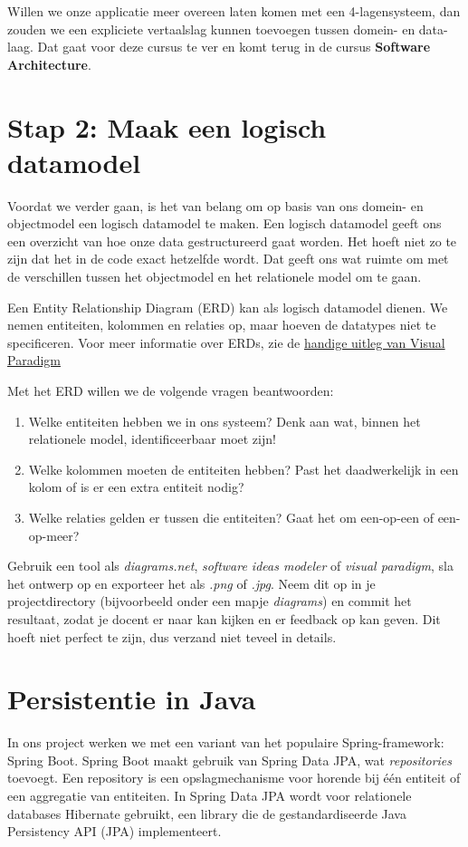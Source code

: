 \documentclass[dutch,a4paper,12pt,doubleside]{book}
\begin{document}
Willen we onze applicatie meer overeen laten komen met een 
4-lagensysteem, dan zouden we een expliciete 
vertaalslag kunnen toevoegen tussen domein- en data-laag. 
Dat gaat voor deze cursus te ver en komt terug in de cursus 
\textbf{Software Architecture}.

\section{Stap 2: Maak een logisch datamodel}
Voordat we verder gaan, is het van belang om op basis van 
ons domein- en objectmodel een logisch datamodel te maken. 
Een logisch datamodel geeft ons een overzicht van hoe onze 
data gestructureerd gaat worden. Het hoeft niet zo te zijn 
dat het in de code exact hetzelfde wordt. Dat geeft ons wat 
ruimte om met de verschillen tussen het objectmodel en het 
relationele model om te gaan.

Een Entity Relationship Diagram (ERD) kan als logisch datamodel dienen.
We nemen entiteiten, kolommen en relaties op, 
maar hoeven de datatypes niet te specificeren.
Voor meer informatie over ERDs, zie de 
\href{https://www.visual-paradigm.com/guide/data-modeling/what-is-entity-relationship-diagram/#erd-data-models-conceptual}{handige uitleg van Visual Paradigm}

Met het ERD willen we de volgende vragen beantwoorden:
\begin{enumerate}
    \item Welke entiteiten hebben we in ons systeem? 
    Denk aan wat, binnen het relationele model, identificeerbaar moet zijn!
    \item Welke kolommen moeten de entiteiten hebben?
    Past het daadwerkelijk in een kolom of is er een extra entiteit nodig?
    \item Welke relaties gelden er tussen die entiteiten?
    Gaat het om een-op-een of een-op-meer?
\end{enumerate}

Gebruik een tool als \textit{diagrams.net}, \textit{software ideas modeler} of \textit{visual paradigm},
sla het ontwerp op en exporteer het als \textit{.png} of \textit{.jpg}. 
Neem dit op in je projectdirectory (bijvoorbeeld onder een mapje \textit{diagrams})
en commit het resultaat, zodat je docent er naar kan kijken en er feedback op kan geven.
Dit hoeft niet perfect te zijn, dus verzand niet teveel in details.

\newpage
\section{Persistentie in Java}
In ons project werken we met een variant van het populaire Spring-framework:
Spring Boot. Spring Boot maakt gebruik van Spring Data JPA, wat \textit{repositories} toevoegt.
Een repository is een opslagmechanisme voor horende bij één entiteit of een aggregatie van entiteiten. 
In Spring Data JPA wordt voor relationele databases Hibernate gebruikt, 
een library die de gestandardiseerde Java Persistency API (JPA) implementeert.
\end{document}
